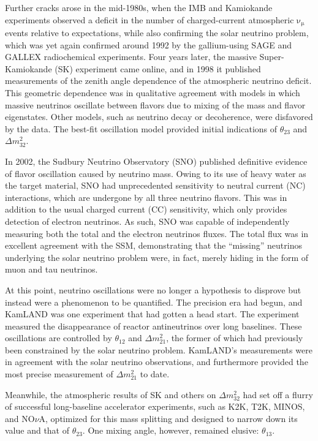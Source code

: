 \documentclass[../thesis.tex]{subfiles}
\begin{document}
Further cracks arose in the mid-1980s, when the IMB and Kamiokande experiments observed a deficit in the number of charged-current atmospheric $\mathrm{\nu_\mu}$ events relative to expectations, while also confirming the solar neutrino problem, which was yet again confirmed around 1992 by the gallium-using SAGE and GALLEX radiochemical experiments. Four years later, the massive Super-Kamiokande (SK) experiment came online, and in 1998 it published measurements of the zenith angle dependence of the atmospheric neutrino deficit. This geometric dependence was in qualitative agreement with models in which massive neutrinos oscillate between flavors due to mixing of the mass and flavor eigenstates. Other models, such as neutrino decay or decoherence, were disfavored by the data. The best-fit oscillation model provided initial indications of $\theta_{23}$ and $\Delta m^2_{32}$. 

In 2002, the Sudbury Neutrino Observatory (SNO) published definitive evidence of flavor oscillation caused by neutrino mass. Owing to its use of heavy water as the target material, SNO had unprecedented sensitivity to neutral current (NC) interactions, which are undergone by all three neutrino flavors. This was in addition to the usual charged current (CC) sensitivity, which only provides detection of electron neutrinos. As such, SNO was capable of independently measuring both the total and the electron neutrinos fluxes. The total flux was in excellent agreement with the SSM, demonstrating that the ``missing'' neutrinos underlying the solar neutrino problem were, in fact, merely hiding in the form of muon and tau neutrinos.

At this point, neutrino oscillations were no longer a hypothesis to disprove but instead were a phenomenon to be quantified. The precision era had begun, and KamLAND was one experiment that had gotten a head start. The experiment measured the disappearance of reactor antineutrinos over long baselines. These oscillations are controlled by $\theta_{12}$ and $\Delta m^2_{21}$, the former of which had previously been constrained by the solar neutrino problem. KamLAND's measurements were in agreement with the solar neutrino observations, and furthermore provided the most precise measurement of $\Delta m^2_{21}$ to date.

Meanwhile, the atmospheric results of SK and others on $\Delta m^2_{32}$ had set off a flurry of successful long-baseline accelerator experiments, such as K2K, T2K, MINOS, and NO$\nu$A, optimized for this mass splitting and designed to narrow down its value and that of $\theta_{23}$. One mixing angle, however, remained elusive: $\theta_{13}$.
\end{document}
